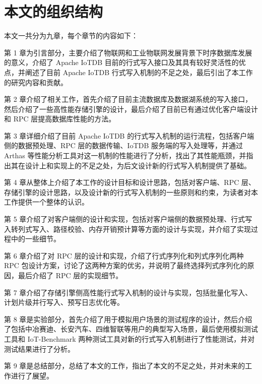 \section{本文的组织结构}

本文一共分为九章，每个章节的内容如下：

第 1 章为引言部分，主要介绍了物联网和工业物联网发展背景下时序数据库发展的意义，介绍了 Apache IoTDB 目前的行式写入接口及其具有较好灵活性的优点，并阐述了目前 Apache IoTDB 行式写入机制的不足之处，最后引出了本工作的研究内容和贡献。

第 2 章介绍了相关工作，首先介绍了目前主流数据库及数据湖系统的写入接口，然后介绍了一些高性能存储引擎的设计，最后介绍了目前已有通过优化客户端设计和 RPC 层提高数据库性能的方法。

第 3 章详细介绍了目前 Apache IoTDB 的行式写入机制的运行流程，包括客户端侧的数据预处理、RPC 层的数据传输、IoTDB 服务端的写入处理等，并通过 Arthas 等性能分析工具对这一机制的性能进行了分析，找出了其性能瓶颈，并指出其在设计上和实现上的不足之处，为后文设计新的行式写入机制提供了基础。

第 4 章从整体上介绍了本工作的设计目标和设计思路，包括对客户端、RPC 层、存储引擎的设计思路，以及设计新的行式写入机制的一些原则和约束，为读者对本工作提供一个整体的认识。

第 5 章介绍了对客户端侧的设计和实现，包括对客户端侧的数据预处理、行式写入转列式写入、路径校验、内存开销预计算等方面的设计与实现，并介绍了实现过程中的一些细节。

第 6 章介绍了对 RPC 层的设计和实现，介绍了行式序列化和列式序列化两种 RPC 包设计方案，讨论了这两种方案的优劣，并说明了最终选择列式序列化的原因，最后介绍了 RPC 层的实现细节。

第 7 章介绍了存储引擎侧高性能行式写入机制的设计与实现，包括批量化写入、计划片级并行写入、预写日志优化等。

第 8 章是实验部分，首先介绍了用于模拟用户场景的测试程序的设计，然后介绍了包括中冶赛迪、长安汽车、四维智联等用户的典型写入场景，最后使用模拟测试工具和 IoT-Benchmark\cite{liu2019benchmarking} 两种测试工具对新的行式写入机制进行了性能测试，并对测试结果进行了分析。

第 9 章是总结部分，总结了本文的工作，指出了本文的不足之处，并对未来的工作进行了展望。